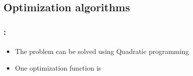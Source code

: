 \documentclass[xcolor=table]{beamer}
\begin{document}
\subsection{Optimization algorithms}

\begin{frame}
	\frametitle{\insertshortsubtitle: \insertsection}
	\framesubtitle{\insertsubsection}
	
	\begin{itemize}
		\item The problem can be solved using Quadratic programming
		\item One optimization function is  \cite{1998-platt}
	\end{itemize}

	
\end{frame}



\end{document}
